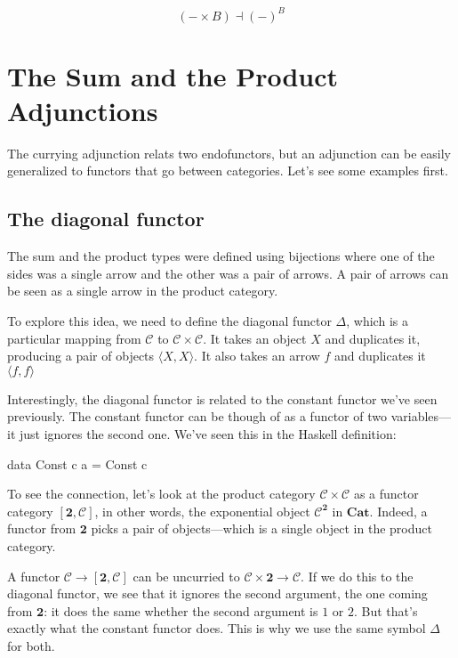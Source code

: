 \documentclass[DaoFP]{subfiles}
\begin{document}
\[ (- \times B) \dashv (-)^B \]

\section{The Sum and the Product Adjunctions}

The currying adjunction relats two endofunctors, but an adjunction can be easily generalized to functors that go between categories. Let's see some examples first.

\subsection{The diagonal functor}

The sum and the product types were defined using bijections where one of the sides was a single arrow and the other was a pair of arrows. A pair of arrows can be seen as a single arrow in the product category. 

To explore this idea, we need to define the diagonal functor $\Delta$, which is a particular mapping from $\mathcal{C}$ to $\mathcal{C} \times \mathcal{C}$. It takes an object $X$ and duplicates it, producing a pair of objects $\langle X, X \rangle$. It also takes an arrow $f$ and duplicates it $\langle f, f \rangle$

Interestingly, the diagonal functor is related to the constant functor we've seen previously. The constant functor can be though of as a functor of two variables---it just ignores the second one. We've seen this in the Haskell definition:
\begin{haskell}
data Const c a = Const c
\end{haskell}

To see the connection, let's look at the product category $\mathcal{C} \times \mathcal{C}$ as a functor category $[ \mathbf{2}, \mathcal{C}]$, in other words, the exponential object $\mathcal{C}^{ \mathbf{2}}$ in $\mathbf{Cat}$. Indeed, a functor from $\mathbf{2}$ picks a pair of objects---which is a single object in the product category.


A functor $\mathcal{C} \to [\mathbf{2}, \mathcal{C}]$ can be uncurried to $\mathcal{C} \times \mathbf{2} \to  \mathcal{C}$. If we do this to the diagonal functor, we see that it ignores the second argument, the one coming from $\mathbf{2}$: it does the same whether the second argument is $1$ or $2$. But that's exactly what the constant functor does. This is why we use the same symbol $\Delta$ for both.
\end{document}
